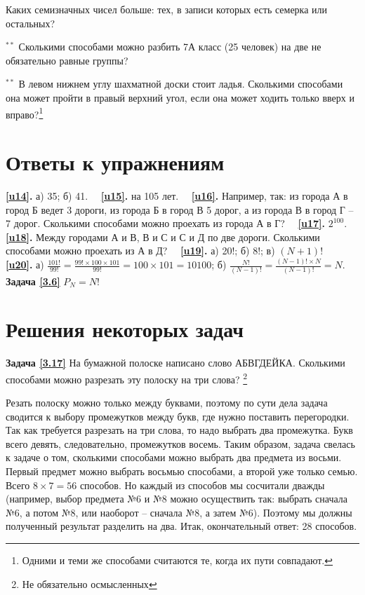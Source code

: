 \begin{thm}
	Каких семизначных чисел больше: тех, в записи которых есть семерка или остальных?
\end{thm}

\begin{thm}$^{\ast\ast}$
	Сколькими способами можно разбить 7А класс (25 человек) на две не обязательно равные группы?
\end{thm}

\begin{thm}$^{\ast\ast}$
	В левом нижнем углу шахматной доски стоит ладья. Сколькими способами она может пройти в правый верхний угол, если она может ходить только вверх и вправо?\footnote{Одними и теми же способами считаются те, когда их пути совпадают.}
\end{thm}
\newpage 

\section{Ответы к упражнениям}
\textbf{\ref{u14}.}	а) 35; б) 41.~~ \textbf{\ref{u15}.} на 105 лет.~~ \textbf{\ref{u16}.} Например, так: из города А в город Б ведет 3 дороги, из города Б в город В 5 дорог, а из города В в город Г – 7 дорог. Сколькими способами можно проехать из города А в Г?~~\textbf{ \ref{u17}.} $2^{100}$.~~ \textbf{\ref{u18}.} Между городами А и В, В и С и С и Д по две дороги. Сколькими способами можно проехать из А в Д?~~ \textbf{\ref{u19}.} а) 20!; б) 8!;  в) $(N+1)!$~~  \textbf{\ref{u20}.} а) $ \frac{101!}{99!}=\frac{99!\times 100\times 101}{99!} = 100\times 101 = 10100$; б) $\frac{N!}{(N-1)!} =\frac{(N-1)!\times N}{(N-1)!} = N$.~~ \textbf{Задача \ref{3.6}}  $P_N=N!$
\section{Решения некоторых задач}
\textbf{Задача \ref{3.17}}
	На бумажной полоске написано слово АБВГДЕЙКА. Сколькими способами можно разрезать эту полоску на три слова? \footnote{Не обязательно осмысленных}

\begin{prf}
	Резать полоску можно только между буквами, поэтому по сути дела задача сводится к выбору промежутков между букв, где нужно поставить перегородки. Так как требуется разрезать на три слова, то надо выбрать два промежутка. Букв всего девять, следовательно, промежутков восемь. Таким образом, задача свелась к задаче о том, сколькими способами можно выбрать два предмета из восьми. Первый предмет можно выбрать восьмью способами, а второй уже только семью. Всего $8\times7=56$ способов. Но каждый из способов мы сосчитали дважды (например, выбор предмета №6 и №8 можно осуществить так: выбрать сначала №6, а потом №8, или наоборот – сначала №8, а затем №6). Поэтому мы должны полученный результат разделить на два. Итак, окончательный ответ: 28 способов.
\end{prf}